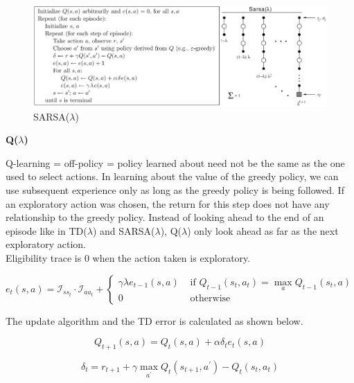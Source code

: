 \documentclass{article}
\begin{document}
\begin{figure}[h]
\includegraphics[scale=0.5]{sarsa_lambda}
\centering
\caption{SARSA($\lambda$)}
\end{figure}

\newpage
\noindent
\textbf{Q($\lambda$)}

\noindent
Q-learning = off-policy = policy learned about need not be the same as the one
used to select actions. In learning about the value of the greedy policy, we can
use subsequent experience only as long as the greedy policy is being followed.
If an exploratory action was chosen, the return for this step does not have any
relationship to the greedy policy. Instead of looking ahead to the end of an
episode like in TD($\lambda$) and SARSA($\lambda$), Q($\lambda$) only look ahead
as far as the next exploratory action.\\

\noindent
Eligibility trace is 0 when the action taken is exploratory.

\begin{equation}
e_{t}(s, a)=\mathcal{I}_{s s_{t}} \cdot \mathcal{I}_{a a_{t}}+\left\{\begin{array}{ll}
\gamma \lambda e_{t-1}(s, a) & \text { if } Q_{t-1}\left(s_{t}, a_{t}\right)=\max _{a} Q_{t-1}\left(s_{t}, a\right) \\
0 & \text { otherwise }
\end{array}\right.
\end{equation}

\noindent
The update algorithm and the TD error is calculated as shown below.

\begin{equation}
Q_{t+1}(s, a)=Q_{t}(s, a)+\alpha \delta_{t} e_{t}(s, a)
\end{equation}

\begin{equation}
\delta_{t}=r_{t+1}+\gamma \max _{a^{\prime}} Q_{t}\left(s_{t+1}, a^{\prime}\right)-Q_{t}\left(s_{t}, a_{t}\right)
\end{equation}
\end{document}
